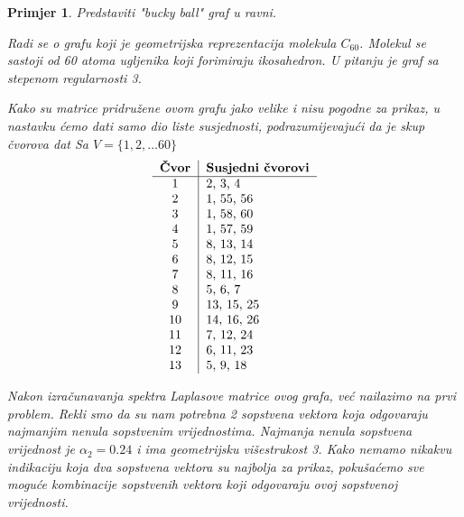 \documentclass[11pt]{article}
\newtheorem{example}{Primjer}
\begin{document}
    \begin{example}
        Predstaviti "bucky ball" graf u ravni. 
        
        Radi se o grafu koji je geometrijska reprezentacija molekula $C_{60}$. Molekul se sastoji od 60 atoma ugljenika koji forimiraju ikosahedron.
        U pitanju je graf sa stepenom regularnosti 3.
        
        Kako su matrice pridružene ovom grafu jako velike i nisu pogodne za prikaz, u nastavku ćemo dati samo dio liste susjednosti, podrazumijevajući da je skup čvorova dat Sa
        $V = \{1,2, \dots 60\}$
        \[
            \begin{tabular}{c|l}
                \textbf{Čvor} & \textbf{Susjedni čvorovi} \\
                \hline
                1 & 2, 3, 4 \\
                2 & 1, 55, 56 \\
                3 & 1, 58, 60 \\
                4 & 1, 57, 59 \\
                5 & 8, 13, 14 \\
                6 & 8, 12, 15 \\
                7 & 8, 11, 16 \\
                8 & 5, 6, 7 \\
                9 & 13, 15, 25 \\
                10 & 14, 16, 26 \\
                11 & 7, 12, 24 \\
                12 & 6, 11, 23 \\
                13 & 5, 9, 18 \\
        \end{tabular}
        \]

        Nakon izračunavanja spektra Laplasove matrice ovog grafa, već nailazimo na prvi problem.
		Rekli smo da su nam potrebna 2 sopstvena vektora koja odgovaraju najmanjim nenula sopstvenim vrijednostima.
		Najmanja nenula sopstvena vrijednost je $\alpha_2 = 0.24$ i ima geometrijsku višestrukost 3.
		Kako nemamo nikakvu indikaciju koja dva sopstvena vektora su najbolja za prikaz, pokušaćemo sve moguće kombinacije sopstvenih vektora koji odgovaraju ovoj sopstvenoj vrijednosti.

        \begin{figure}[h]
            \centering
			\hfill
        \end{figure}


\end{example}
\end{document}
